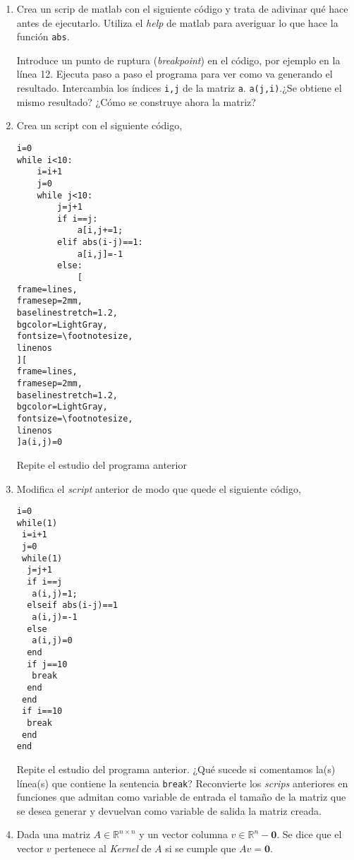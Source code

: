 \begin{enumerate}
\item Crea un scrip de matlab con el siguiente código y trata de adivinar qué hace antes de ejecutarlo. Utiliza el \emph{help} de matlab para averiguar lo que hace la función \verb|abs|.

Introduce un punto de ruptura (\emph{breakpoint}) en el código, por ejemplo en la línea 12. Ejecuta paso a paso el programa para ver como va generando el resultado. Intercambia los índices \verb|i,j| de la matriz \verb|a|. \verb|a(j,i)|.¿Se obtiene el mismo resultado? ¿Cómo se construye ahora la matriz?

\item Crea un script con el siguiente código,
\begin{verbatim}
i=0
while i<10:
    i=i+1
    j=0
    while j<10:
        j=j+1
        if i==j:
            a[i,j+=1;
        elif abs(i-j)==1:
            a[i,j]=-1
        else:
            [
frame=lines,
framesep=2mm,
baselinestretch=1.2,
bgcolor=LightGray,
fontsize=\footnotesize,
linenos
][
frame=lines,
framesep=2mm,
baselinestretch=1.2,
bgcolor=LightGray,
fontsize=\footnotesize,
linenos
]a(i,j)=0
\end{verbatim}

Repite el estudio del programa anterior

\item Modifica el \emph{script} anterior de modo que quede el siguiente código,
\begin{lstlisting}
i=0
while(1)
 i=i+1
 j=0
 while(1)
  j=j+1
  if i==j
   a(i,j)=1;
  elseif abs(i-j)==1
   a(i,j)=-1
  else
   a(i,j)=0
  end
  if j==10
   break
  end
 end
 if i==10
  break
 end
end
\end{lstlisting}
Repite el estudio del programa anterior. ¿Qué sucede si comentamos la(s) línea(s) que contiene la sentencia \verb|break|?
Reconvierte los \emph{scrips} anteriores en funciones que admitan como variable de entrada el tamaño de la matriz que se desea generar y devuelvan como variable de salida la matriz creada.

\item Dada una matriz $A \in \mathbb{R}^{n\times n}$ y un vector columna $v \in \mathbb{R}^n-{\mathbf{0}}$. Se dice que el vector $v$ pertenece al \emph{Kernel} de $A$ si se cumple que $Av =\mathbf{0}$.




\end{enumerate}
